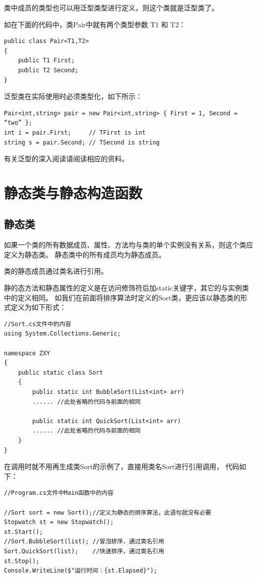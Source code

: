 类中成员的类型也可以用泛型类型进行定义，则这个类就是泛型类了。

如在下面的代码中，类Pair中就有两个类型参数 T1 和 T2：

\begin{lstlisting}
public class Pair<T1,T2>
{
    public T1 First;
    public T2 Second;
}
\end{lstlisting}

泛型类在实际使用时必须类型化，如下所示：

\begin{lstlisting}
Pair<int,string> pair = new Pair<int,string> { First = 1, Second = “two” };
int i = pair.First;     // TFirst is int
string s = pair.Second; // TSecond is string
\end{lstlisting}

有关泛型的深入阅读请阅读相应的资料。


\section{静态类与静态构造函数}

\subsection{静态类}

如果一个类的所有数据成员、属性、方法均与类的单个实例没有关系，则这个类应定义为静态类。
静态类中的所有成员均为静态成员。

类的静态成员通过类名进行引用。

静的态方法和静态属性的定义是在访问修饰符后加static关键字，其它的与实例类中的定义相同。
如我们在前面将排序算法时定义的Sort类，更应该以静态类的形式定义为如下形式：
\begin{lstlisting}
//Sort.cs文件中的内容
using System.Collections.Generic;

namespace ZXY
{
    public static class Sort
    {
        public static int BubbleSort(List<int> arr)
        ...... //此处省略的代码与前面的相同

        public static int QuickSort(List<int> arr)
        ...... //此处省略的代码与前面的相同
    }
}
\end{lstlisting}

在调用时就不用再生成类Sort的示例了，直接用类名Sort进行引用调用，
代码如下：

\begin{lstlisting}
//Program.cs文件中Main函数中的内容

//Sort sort = new Sort();//定义为静态的排序算法，此语句就没有必要
Stopwatch st = new Stopwatch();
st.Start();
//Sort.BubbleSort(list); //冒泡排序，通过类名引用
Sort.QuickSort(list);    //快速排序，通过类名引用
st.Stop();
Console.WriteLine($"运行时间：{st.Elapsed}");
\end{lstlisting}




